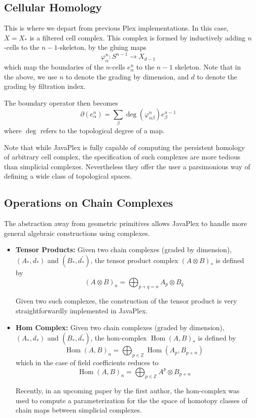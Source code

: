 \documentclass[10pt]{article}
\newcommand{\Hom}{\operatorname{Hom}}
\begin{document}
\subsection{Cellular Homology}

This is where we depart from previous Plex implementations. In this case, $X = X_*$ is a filtered cell complex. This complex is formed by inductively adding $n$-cells to the $n-1$-skeleton, by the gluing maps 
$$\varphi_{\alpha}^n: S^{n-1} \rightarrow X_{d-1}$$
which map the boundaries of the $n$-cells $e_{\alpha}^n$ to the $n-1$ skeleton. Note that in the above, we use $n$ to denote the grading by dimension, and $d$ to denote the grading by filtration index.

The boundary operator then becomes 
$$\partial(e_{\alpha}^n) = \sum_{\beta} \deg(\varphi_{\alpha \beta}^n) e_{\beta}^{n-1}$$
where $\deg$ refers to the topological degree of a map.

Note that while JavaPlex is fully capable of computing the persistent homology of arbitrary cell complex, the specification of such complexes are more tedious than simplicial complexes. Nevertheless they offer the user a parsimonious way of defining a wide class of topological spaces.

\subsection{Operations on Chain Complexes}

The abstraction away from geometric primitives allows JavaPlex to handle more general algebraic constructions using complexes.

\begin{itemize}
\item {\bf Tensor Products:} Given two chain complexes (graded by dimension), $(A_*, d_*)$ and $(B_*, d^{\prime}_*)$, the tensor product complex $(A \otimes B)_*$ is defined by
$$(A \otimes B)_n = \bigoplus_{p + q = n} A_p \otimes B_q$$

Given two such complexes, the construction of the tensor product is very straightforwardly implemented in JavaPlex. 

\item {\bf Hom Complex:} Given two chain complexes (graded by dimension), $(A_*, d_*)$ and $(B_*, d^{\prime}_*)$, the hom-complex $\Hom(A,B)_*$ is defined by
$$\Hom(A, B)_n = \bigoplus_{p \in \mathbb{Z}} \Hom(A_p, B_{p + n})$$
which in the case of field coefficients reduces to 
$$\Hom(A, B)_n = \bigoplus_{p \in \mathbb{Z}} A^p \otimes B_{p + n}$$

Recently, in an upcoming paper by the first author, the hom-complex was used to compute a parameterization for the the space of homotopy classes of chain maps between simplicial complexes.


\end{itemize}
\end{document}
